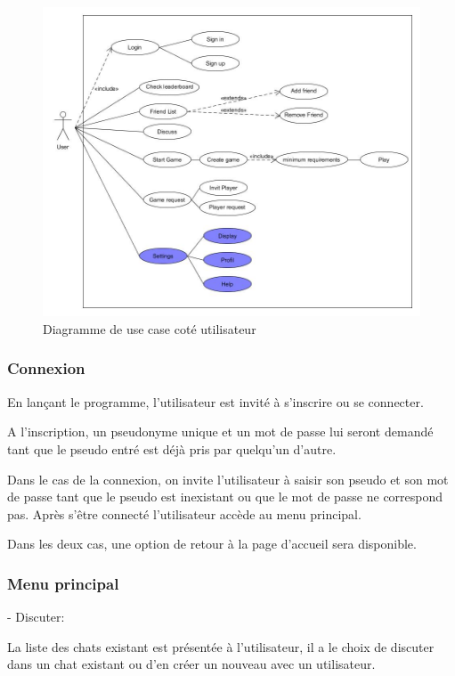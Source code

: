 \documentclass[a4paper,12pt]{article}
\begin{document}
\begin{figure}[h!]
\centering
\includegraphics[width=15cm]{UserUseCase}
\caption{Diagramme de use case coté utilisateur}
\label{fig:UerUseCase}
\end{figure}

\subsubsection{Connexion}
En lançant le programme, l'utilisateur est invité à s'inscrire ou se connecter.

A l'inscription, un pseudonyme unique et un mot de passe lui seront demandé tant que le pseudo entré est déjà pris par quelqu'un d'autre.

Dans le cas de la connexion, on invite l'utilisateur à saisir son pseudo et son mot de passe tant que le pseudo est inexistant ou que le mot de passe ne correspond pas. Après s’être connecté l'utilisateur accède au menu principal.

Dans les deux cas, une option de retour à la page d'accueil sera disponible.

\subsubsection{Menu principal}

- Discuter:

La liste des chats existant est présentée à l'utilisateur, il a le choix de discuter dans un chat existant ou d'en créer un nouveau avec un utilisateur. 
\end{document}

